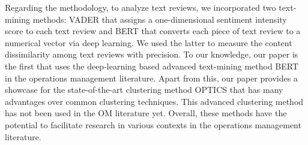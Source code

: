 \documentclass[mnsc,blindrev]{informs3}
\def\bibsep{\smallskipamount}%
\begin{document}
Regarding the methodology, to analyze text reviews, we incorporated two text-mining methods: VADER that assigns a one-dimensional sentiment intensity score to each text review  and BERT that converts each piece of text review to a numerical vector via deep learning. We used the latter to measure the content dissimilarity among text reviews with precision. To our knowledge, our paper is the first that uses the deep-learning based advanced text-mining method BERT in the operations management literature.  Apart from this, our paper provides a showcase for the state-of-the-art clustering method OPTICS that has many advantages over common clustering techniques. This advanced clustering method has not been used in the OM literature yet. Overall, these methods have the potential to facilitate research in various contexts in the operations management literature.
	

{
\SingleSpacedXI
}	


\ECSwitch


\vspace{-10pt}
%
\end{document}
